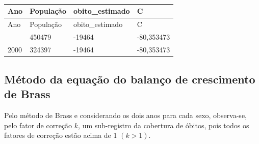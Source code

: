 \documentclass[
  12pt,
  a4paper,
]{scrreprt}
\begin{document}
\begin{longtable}[]{@{}llll@{}}
\caption{}\label{T_9d74d}\tabularnewline
\toprule\noalign{}
Ano & População & obito\_estimado & C \\
\midrule\noalign{}
\endfirsthead
\toprule\noalign{}
Ano & População & obito\_estimado & C \\
\midrule\noalign{}
\endhead
\bottomrule\noalign{}
\endlastfoot
2010 & 450479 & -19464 & -80,353473 \\
2000 & 324397 & -19464 & -80,353473 \\
\end{longtable}

\subsection{Método da equação do balanço de crescimento de
Brass}\label{muxe9todo-da-equauxe7uxe3o-do-balanuxe7o-de-crescimento-de-brass-1}

Pelo método de Brass e considerando os dois anos para cada sexo,
observa-se, pelo fator de correção \(k\), um sub-registro da cobertura
de óbitos, pois todos os fatores de correção estão acima de 1
\(\left(k > 1\right)\).
\end{document}
